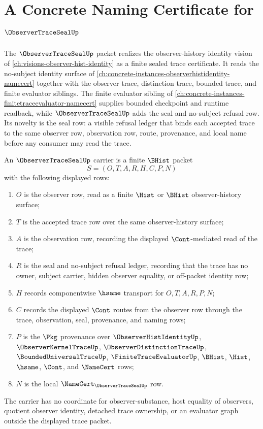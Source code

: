 \chapter{A Concrete Naming Certificate for $\ObserverTraceSealUp$}
\label{ch:concrete-instances-observertraceseal-namecert}

The $\ObserverTraceSealUp$ packet realizes the observer-history identity vision of \autoref{ch:visions-observer-hist-identity} as a finite sealed trace certificate. It reads the no-subject identity surface of \autoref{ch:concrete-instances-observerhistidentity-namecert} together with the observer trace, distinction trace, bounded trace, and finite evaluator siblings. The finite evaluator sibling of \autoref{ch:concrete-instances-finitetraceevaluator-namecert} supplies bounded checkpoint and runtime readback, while $\ObserverTraceSealUp$ adds the seal and no-subject refusal row. Its novelty is the seal row: a visible refusal ledger that binds each accepted trace to the same observer row, observation row, route, provenance, and local name before any consumer may read the trace.

\begin{definition}
\label{def:observer-trace-seal-carrier}
An $\ObserverTraceSealUp$ carrier is a finite $\BHist$ packet
$$
S=(O,T,A,R,H,C,P,N)
$$
with the following displayed rows:
\begin{enumerate}
\item $O$ is the observer row, read as a finite $\Hist$ or $\BHist$ observer-history surface;
\item $T$ is the accepted trace row over the same observer-history surface;
\item $A$ is the observation row, recording the displayed $\Cont$-mediated read of the trace;
\item $R$ is the seal and no-subject refusal ledger, recording that the trace has no owner, subject carrier, hidden observer equality, or off-packet identity row;
\item $H$ records componentwise $\hsame$ transport for $O,T,A,R,P,N$;
\item $C$ records the displayed $\Cont$ routes from the observer row through the trace, observation, seal, provenance, and naming rows;
\item $P$ is the $\Pkg$ provenance over $\ObserverHistIdentityUp$, $\ObserverKernelTraceUp$, $\ObserverDistinctionTraceUp$, $\BoundedUniversalTraceUp$, $\FiniteTraceEvaluatorUp$, $\BHist$, $\Hist$, $\hsame$, $\Cont$, and $\NameCert$ rows;
\item $N$ is the local $\NameCert_{\ObserverTraceSealUp}$ row.
\end{enumerate}
The carrier has no coordinate for observer-substance, host equality of observers, quotient observer identity, detached trace ownership, or an evaluator graph outside the displayed trace packet.
\end{definition}

